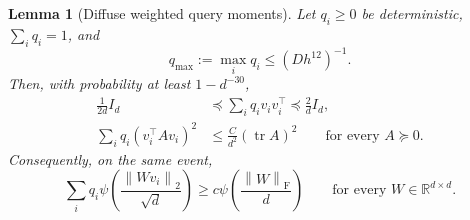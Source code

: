 \documentclass[11pt]{article}
\newtheorem{lemma}[theorem]{Lemma}
\theoremstyle{remark}
\newcommand{\R}{\mathbb R}
\newcommand{\norm}[1]{\left\lVert #1\right\rVert}
\newcommand{\F}{\mathrm{F}}
\newcommand{\1}{\mathbf 1}
\newcommand{\tr}{\operatorname{tr}}
\begin{document}
\begin{lemma}[Diffuse weighted query moments]
\label{lem:weighted-query}
Let $q_i\geq0$ be deterministic, $\sum_iq_i=1$, and
\begin{equation}
 q_{\max}:=\max_iq_i\leq(Dh^{12})^{-1}.
 \label{eq:qmax}
\end{equation}
Then, with probability at least $1-d^{-30}$,
\begin{align}
 \frac1{2d}I_d
 &\preceq\sum_iq_iv_iv_i^\top
 \preceq\frac2dI_d,
 \label{eq:weighted-cov}\\
 \sum_iq_i(v_i^\top Av_i)^2
 &\leq\frac{C}{d^2}(\tr A)^2
 \qquad\text{for every }A\succeq0.
 \label{eq:weighted-fourth}
\end{align}
Consequently, on the same event,
\begin{equation}
 \sum_iq_i\psi\!\left(\frac{\norm{Wv_i}_2}{\sqrt d}\right)
 \geq c\psi\!\left(\frac{\norm W_{\F}}d\right)
 \qquad\text{for every }W\in\R^{d\times d}.
 \label{eq:weighted-coercivity}
\end{equation}
\end{lemma}
\end{document}
